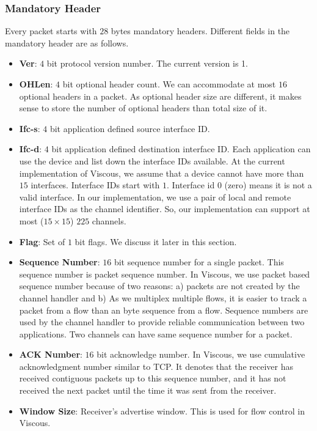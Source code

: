 \subsubsection{Mandatory Header}
Every packet starts with $28$ bytes mandatory headers. Different fields in the mandatory header are as follows. 
\begin{itemize}
    \item \textbf{Ver}: $4$ bit protocol version number. The current version is 1.
    
    \item \textbf{OHLen}: $4$ bit optional header count. We can accommodate at most $16$ optional headers in a packet. As optional header size are different, it makes sense to store the number of optional headers than total size of it.
    \item \textbf{Ifc-s}: $4$ bit application defined source interface ID.
    \item \textbf{Ifc-d}: $4$ bit application defined destination interface ID. Each application can use the device and list down the interface IDs available. At the current implementation of Viscous, we assume that a device cannot have more than $15$ interfaces. Interface IDs start with $1$. Interface id $0$ (zero) means it is not a valid interface. In our implementation, we use a pair of local and remote interface IDs as the channel identifier. So, our implementation can support at most ($15\times15$) $225$ channels.
    \item \textbf{Flag}: Set of $1$ bit flags. We discuss it later in this section.
    \item \textbf{Sequence Number}: $16$ bit sequence number for a single packet. This sequence number is packet sequence number. In Viscous, we use packet based sequence number because of two reasons: a) packets are not created by the channel handler and b) As we multiplex multiple flows, it is easier to track a packet from a flow than an byte sequence from a flow. Sequence numbers are used by the channel handler to provide reliable communication between two applications. Two channels can have same sequence number for a packet.
    \item \textbf{ACK Number}: $16$ bit acknowledge number. In Viscous, we use cumulative acknowledgment number similar to TCP. It denotes that the receiver has received contiguous packets up to this sequence number, and it has not received the next packet until the time it was sent from the receiver.
    
    \item \textbf{Window Size}: Receiver's advertise window. This is used for flow control in Viscous. 
    

\end{itemize}
